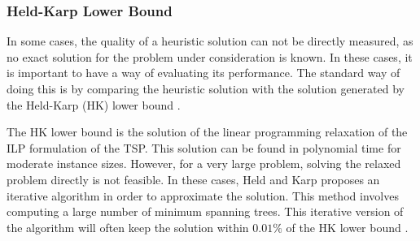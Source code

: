 \subsubsection{Held-Karp Lower Bound}

In some cases, the quality of a heuristic solution can not be directly measured, as no exact solution for the problem under consideration is known. In these cases, it is important to have a way of evaluating its performance. The standard way of doing this is by comparing the heuristic solution with the solution generated by the Held-Karp (HK) lower bound \cite{held_karp_lb}.

The HK lower bound is the solution of the linear programming relaxation of the ILP formulation of the TSP. This solution can be found in polynomial time for moderate instance sizes. However, for a very large problem, solving the relaxed problem directly is not feasible. In these cases, Held and Karp proposes an iterative algorithm in order to approximate the solution. This method involves computing a large number of minimum spanning trees. This iterative version of the algorithm will often keep the solution
within $0.01\%$ of the HK lower bound \cite{heuristics_tsp}.
